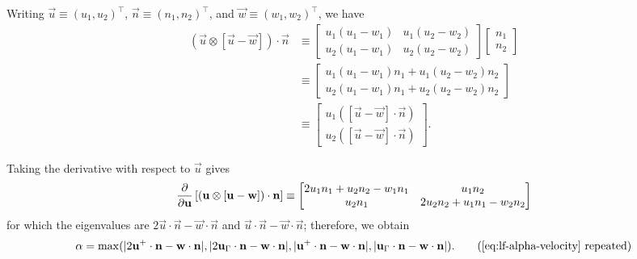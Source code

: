     Writing $\vec{u} \equiv (u_1, u_2)^\intercal$, $\vec{n} \equiv (n_1, n_2)^\intercal$, and $\vec{w} \equiv (w_1, w_2)^\intercal$, we have
    \begin{align*}
        (\vec{u} \otimes [\vec{u} - \vec{w}]) \cdot \vec{n} & \equiv
        \begin{bmatrix}
            u_1 (u_1 - w_1) & u_1 (u_2 - w_2) \\
            u_2 (u_1 - w_1) & u_2 (u_2 - w_2)
        \end{bmatrix}
        \begin{bmatrix}
            n_1 \\
            n_2
        \end{bmatrix}
        \\
        & \equiv \begin{bmatrix}
            u_1 (u_1 - w_1) n_1 + u_1 (u_2 - w_2) n_2 \\
            u_2 (u_1 - w_1) n_1 + u_2 (u_2 - w_2) n_2
        \end{bmatrix}
        \\
        & \equiv \begin{bmatrix}
            u_1 ([\vec{u} - \vec{w}] \cdot \vec{n}) \\
            u_2 ([\vec{u} - \vec{w}] \cdot \vec{n})
        \end{bmatrix}.
    \end{align*}

    Taking the derivative with respect to $\vec{u}$ gives
    \begin{equation*}
        \pdv{}{\boldsymbol{\mathbf{u}}}\left[ (\boldsymbol{\mathbf{u}} \otimes [\boldsymbol{\mathbf{u}} - \boldsymbol{\mathbf{w}}]) \cdot \boldsymbol{\mathbf{n}} \right] \equiv \begin{bmatrix}
            2u_1n_1 + u_2n_2 - w_1n_1 & u_1n_2 \\
            u_2n_1 & 2u_2n_2 + u_1n_1 - w_2n_2
        \end{bmatrix}
    \end{equation*}
    for which the eigenvalues are $2\vec{u} \cdot \vec{n} - \vec{w}\cdot\vec{n}$ and $\vec{u} \cdot \vec{n} - \vec{w}\cdot\vec{n}$; therefore, we obtain
    \begin{equation}
        \alpha = \max(|2\vec{u}^+\cdot\vec{n} - \vec{w} \cdot \vec{n}|, |2\vec{u}_\Gamma\cdot\vec{n} - \vec{w} \cdot \vec{n}|, |\vec{u}^+ \cdot \vec{n} - \vec{w} \cdot \vec{n}|, |\vec{u}_\Gamma \cdot \vec{n} - \vec{w} \cdot \vec{n}|).
        \retag{eq:lf-alpha-velocity}
    \end{equation}